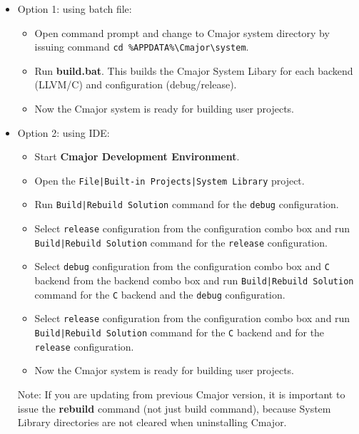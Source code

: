 \documentclass[oneside, a4paper, 11pt]{article}
\begin{document}
\begin{itemize}

\item
Option 1: using batch file:

\begin{itemize}

\item
Open command prompt and change to Cmajor system directory by issuing command
\verb|cd %APPDATA%\Cmajor\system|.

\item
Run \textbf{build.bat}.
This builds the Cmajor System Libary for each backend (LLVM/C) and
configuration (debug/release).

\item
Now the Cmajor system is ready for building user projects.

\end{itemize}

\item
Option 2: using IDE:

\begin{itemize}

\item
Start \textbf{Cmajor Development Environment}.

\item
Open the \verb!File|Built-in Projects|System Library! project.

\item
Run \verb!Build|Rebuild Solution! command for the \verb|debug| configuration.

\item
Select \verb|release| configuration from the configuration combo box
and run\\
\verb!Build|Rebuild Solution! command for the \verb|release| configuration.

\item
Select \verb|debug| configuration from the configuration combo box and
\verb|C| backend from the backend combo box
and run \verb!Build|Rebuild Solution! command for the \verb|C| backend and the \verb|debug| configuration.

\item
Select \verb|release| configuration from the configuration combo box
and run\\
\verb!Build|Rebuild Solution! command for the \verb|C| backend and for the \verb|release| configuration.

\item
Now the Cmajor system is ready for building user projects.

\end{itemize}

Note: If you are updating from previous Cmajor version, it is important to issue the \textbf{rebuild} command
(not just build command), because System Library directories are not cleared when uninstalling Cmajor.

\end{itemize}
\end{document}
